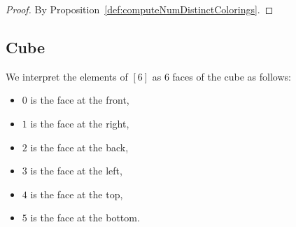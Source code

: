 \begin{proof}
  \leanok
  By Proposition~\ref{def:computeNumDistinctColorings}.
\end{proof}

\subsection{Cube}

We interpret the elements of $[6]$ as $6$ faces of the cube as follows:
\begin{itemize}
  \item $0$ is the face at the front,

  \item $1$ is the face at the right,

  \item $2$ is the face at the back,

  \item $3$ is the face at the left,

  \item $4$ is the face at the top,

  \item $5$ is the face at the bottom.
\end{itemize}

